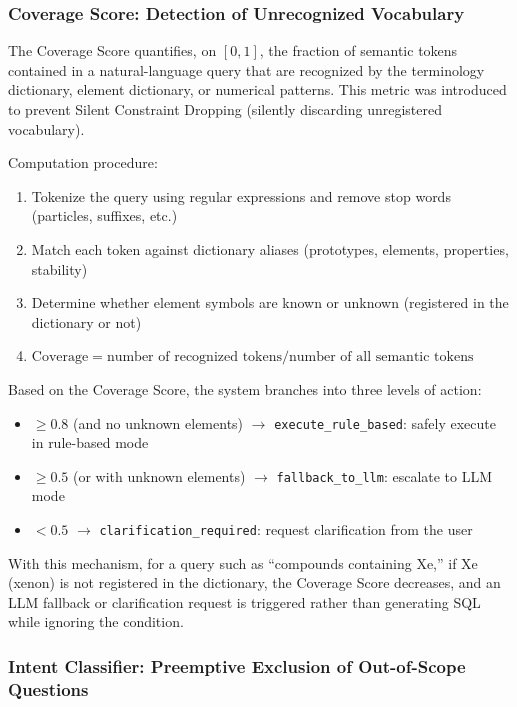 \documentclass[5p,twocolumn]{elsarticle}
\begin{document}
\subsubsection{Coverage Score: Detection of Unrecognized Vocabulary}
\label{sec:coverage_score}

The Coverage Score quantifies, on $[0, 1]$, the fraction of semantic tokens contained in a natural-language query
that are recognized by the terminology dictionary, element dictionary, or numerical patterns.
This metric was introduced to prevent Silent Constraint Dropping (silently discarding unregistered vocabulary).

Computation procedure:
\begin{enumerate}
  \item Tokenize the query using regular expressions and remove stop words (particles, suffixes, etc.)
  \item Match each token against dictionary aliases (prototypes, elements, properties, stability)
  \item Determine whether element symbols are known or unknown (registered in the dictionary or not)
  \item $\text{Coverage} = \text{number of recognized tokens} / \text{number of all semantic tokens}$
\end{enumerate}

Based on the Coverage Score, the system branches into three levels of action:

\begin{itemize}
  \item $\geq 0.8$ (and no unknown elements) $\to$ \texttt{execute\_rule\_based}:
    safely execute in rule-based mode
  \item $\geq 0.5$ (or with unknown elements) $\to$ \texttt{fallback\_to\_llm}:
    escalate to LLM mode
  \item $< 0.5$ $\to$ \texttt{clarification\_required}:
    request clarification from the user
\end{itemize}

With this mechanism, for a query such as ``compounds containing Xe,''
if Xe (xenon) is not registered in the dictionary, the Coverage Score decreases,
and an LLM fallback or clarification request is triggered rather than generating SQL while ignoring the condition.

\subsubsection{Intent Classifier: Preemptive Exclusion of Out-of-Scope Questions}
\label{sec:intent_classifier}
\end{document}
